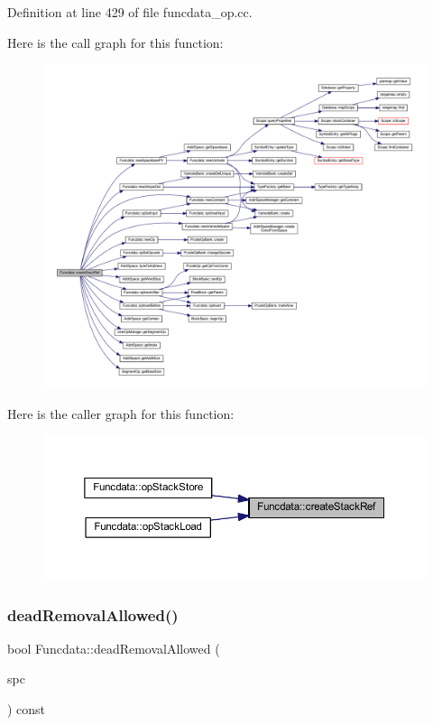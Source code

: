 Definition at line 429 of file funcdata\+\_\+op.\+cc.

Here is the call graph for this function\+:
\nopagebreak
\begin{figure}[H]
\begin{center}
\leavevmode
\includegraphics[width=350pt]{class_funcdata_a65e8837c811e309578d2828486bcafb5_cgraph}
\end{center}
\end{figure}
Here is the caller graph for this function\+:
\nopagebreak
\begin{figure}[H]
\begin{center}
\leavevmode
\includegraphics[width=350pt]{class_funcdata_a65e8837c811e309578d2828486bcafb5_icgraph}
\end{center}
\end{figure}
\mbox{\label{class_funcdata_adaf432bbbd299e976c8f02fc97fb3dbe}} 
\subsubsection{\texorpdfstring{deadRemovalAllowed()}{deadRemovalAllowed()}}
{\footnotesize\ttfamily bool Funcdata\+::dead\+Removal\+Allowed (\begin{DoxyParamCaption}\item[{\mbox{\hyperlink{class_addr_space}{Addr\+Space}} $\ast$}]{spc }\end{DoxyParamCaption}) const\hspace{0.3cm}{\ttfamily [inline]}}



